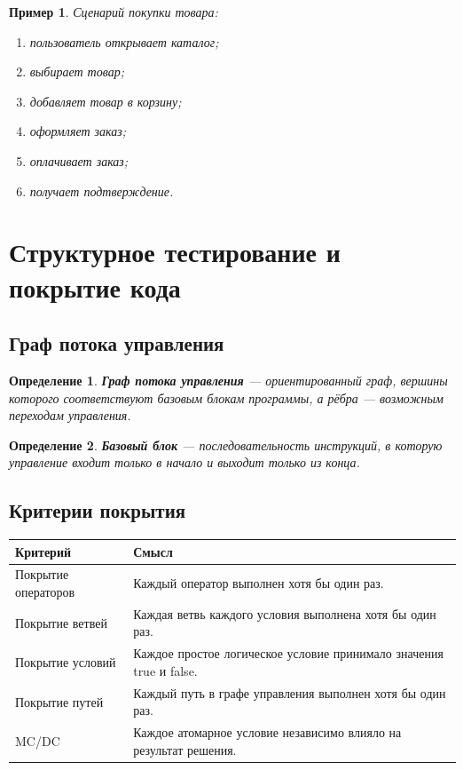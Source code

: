 \documentclass[12pt,a4paper]{article}
\newtheorem{definition}{Определение}
\newtheorem{example}{Пример}
\begin{document}
\begin{example}
Сценарий покупки товара:
\begin{enumerate}
    \item пользователь открывает каталог;
    \item выбирает товар;
    \item добавляет товар в корзину;
    \item оформляет заказ;
    \item оплачивает заказ;
    \item получает подтверждение.
\end{enumerate}
\end{example}

\section{Структурное тестирование и покрытие кода}

\subsection{Граф потока управления}

\begin{definition}
\textbf{Граф потока управления} --- ориентированный граф, вершины которого соответствуют базовым блокам программы, а рёбра --- возможным переходам управления.
\end{definition}

\begin{definition}
\textbf{Базовый блок} --- последовательность инструкций, в которую управление входит только в начало и выходит только из конца.
\end{definition}

\subsection{Критерии покрытия}

\begin{center}
\begin{tabular}{p{4cm} p{9cm}}
\toprule
\textbf{Критерий} & \textbf{Смысл} \\
\midrule
Покрытие операторов & Каждый оператор выполнен хотя бы один раз. \\
Покрытие ветвей & Каждая ветвь каждого условия выполнена хотя бы один раз. \\
Покрытие условий & Каждое простое логическое условие принимало значения true и false. \\
Покрытие путей & Каждый путь в графе управления выполнен хотя бы один раз. \\
MC/DC & Каждое атомарное условие независимо влияло на результат решения. \\
\bottomrule
\end{tabular}
\end{center}
\end{document}

